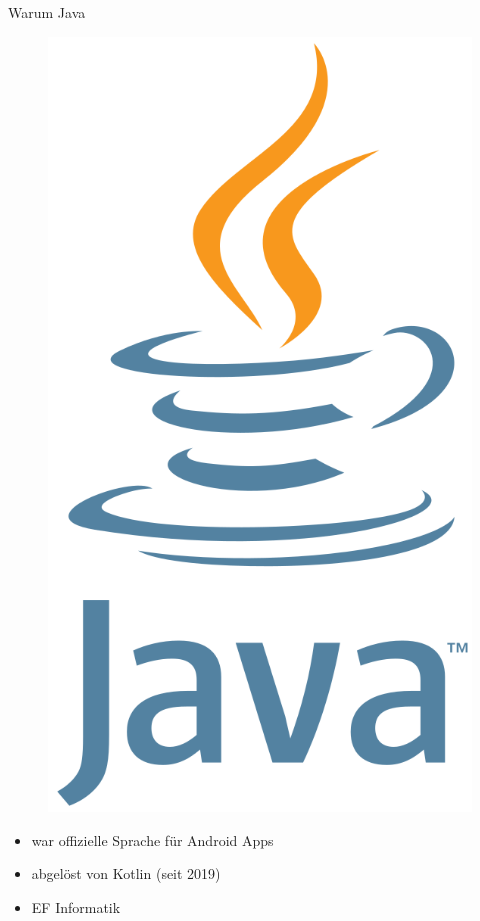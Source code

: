 \documentclass[aspectratio=169]{beamer}
\begin{document}
\begin{frame}{Warum Java}
\begin{varwidth}{.3\textwidth}
        \begin{figure}
            \centering
            \includegraphics[height=.8\textheight]{media/java-logo.png}
        \end{figure}
    \end{varwidth}
    \hfill
    \begin{varwidth}{.6\textwidth}
        \begin{itemize}
            \item war offizielle Sprache für Android Apps
            \item abgelöst von Kotlin (seit 2019)
            \item EF Informatik
        \end{itemize}
    \end{varwidth} 
\end{frame}
\end{document}
